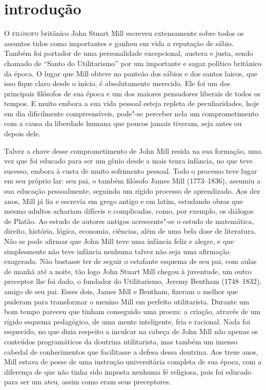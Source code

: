 
\chapter[Introdução, por Ari R. Tank Brito]{introdução}

\noindent\textsc{O filósofo} britânico John Stuart Mill escreveu
extensamente sobre todos os assuntos tidos como importantes e ganhou em
vida a reputação de sábio. Também foi portador de uma
personalidade excepcional, austera e justa, sendo chamado de ``Santo do
Utilitarismo'' por um importante e sagaz político britânico da época. O
lugar que Mill obteve no panteão dos sábios e dos santos laicos, que
isso fique claro desde o início, é absolutamente merecido. Ele foi um
dos principais filósofos de sua época e um dos maiores pensadores
liberais de todos os tempos. E muito embora a sua vida pessoal esteja
repleta de peculiaridades, hoje em dia dificilmente compreensíveis,
pode"-se perceber nela um comprometimento com a causa da liberdade
humana que poucos jamais tiveram, seja antes ou depois dele. 

Talvez a chave desse comprometimento de John Mill resida na sua
formação, uma vez que foi educado para ser um gênio desde a mais tenra
infância, no que teve sucesso, embora à custa de muito sofrimento
pessoal. Todo o processo teve lugar em seu próprio lar: seu pai, o
também filósofo James Mill (1773--1836), assumiu a sua educação
pessoalmente, seguindo um rígido processo de aprendizado. Aos dez anos,
Mill já lia e escrevia em grego antigo e em latim, estudando obras que
mesmo adultos achariam difíceis e complicadas, como, por exemplo, os diálogos de
Platão. Ao estudo de autores antigos acrescente"-se o estudo de
matemática, direito, história, lógica, economia, ciências, além de uma
bela dose de literatura. Não se pode afirmar que John Mill teve uma
infância feliz e alegre, e que simplesmente não teve infância nenhuma
talvez não seja uma afirmação exagerada. Não bastasse ter de seguir o
estafante esquema de seu pai, com aulas de manhã até a noite, tão logo
John Stuart Mill chegou à juventude, um outro preceptor lhe foi dado, o
fundador do Utilitarismo, Jeremy Bentham (1748--1832), amigo de seu
pai. Esses dois, James Mill e Bentham, fizeram o melhor que puderam
para transformar o menino Mill em perfeito utilitarista. Durante um bom
tempo pareceu que tinham conseguido uma proeza: a criação, através de um
rígido esquema pedagógico, de uma mente inteligente, fria e racional.
Nada foi esquecido, no que dizia respeito a inculcar na cabeça de John
Mill não apenas os conteúdos programáticos da doutrina utilitarista,
mas também um imenso cabedal de conhecimentos que facilitasse a defesa
dessa doutrina. Aos treze anos, Mill estava de posse de uma instrução
universitária completa de sua época, com a diferença de que não tinha
sido imposta nenhuma fé religiosa, pois foi educado para ser um
ateu, assim como eram seus preceptores. 

